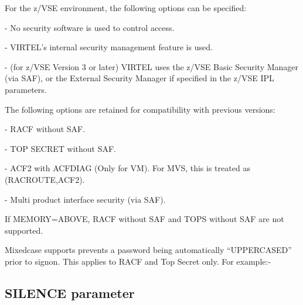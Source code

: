 \documentclass[letterpaper,10pt,english]{sphinxmanual}
\begin{document}
For the z/VSE environment, the following options can be specified:

 - No security software is used to control access.

 - VIRTEL’s internal security management feature is used.

 - (for z/VSE Version 3 or later) VIRTEL uses the z/VSE Basic Security Manager (via SAF), or the External Security Manager if specified in the z/VSE IPL parameters.

The following options are retained for compatibility with previous versions:

 - RACF without SAF.

 - TOP SECRET without SAF.

 - ACF2 with ACFDIAG (Only for VM). For MVS, this is treated as (RACROUTE,ACF2).

 - Multi product interface security (via SAF).

If MEMORY=ABOVE, RACF without SAF and TOPS without SAF are not supported.

Mixedcase supports prevents a password being automatically “UPPERCASED” prior to signon. This applies to RACF and Top Secret only. For example:-

\begin{sphinxVerbatim}[commandchars=\\\{\}]
\end{sphinxVerbatim}


\subsection{SILENCE parameter}
\label{\detokenize{Installation_Guide:silence-parameter}}\label{\detokenize{Installation_Guide:index-113}}
\begin{sphinxVerbatim}[commandchars=\\\{\}]
 
\end{sphinxVerbatim}
\end{document}
